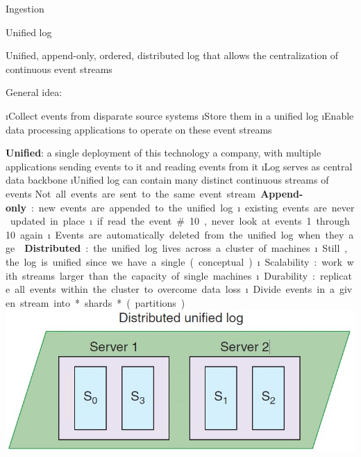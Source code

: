 \begin{frame}[allowframebreaks]{Ingestion}
\framebreak

\begin{block}{Unified log}

Unified, append-only, ordered, distributed log that allows the centralization of continuous event streams

\end{block}

General idea:

\i Collect events from disparate source systems
\i Store them in a unified log
\i Enable data processing applications to operate on these event streams

\framebreak

\textbf{Unified}: a single deployment of this technology a company, with multiple applications sending events to it and reading events from it
  \i Log serves as central data backbone
  \i Unified log can contain many distinct continuous streams of events
  \si Not all events are sent to the same event stream

\textbf{Append-only}: new events are appended to the unified log
\i existing events are never updated in place
\i if read the event \#10, never look at events 1 through 10 again
\i Events are automatically deleted from the unified log when they age 

\framebreak
\textbf{Distributed}: the unified log lives across a cluster of machines

\i Still, the log is unified since we have a single (conceptual)
\i Scalability: work with streams larger than the capacity of single machines
\i Durability: replicate all events within the cluster to overcome data loss
\i Divide events in a given stream into *shards* (partitions)

\includegraphics[width=.6\linewidth]{imgs/eventstream_shard.jpg}


\end{frame}
